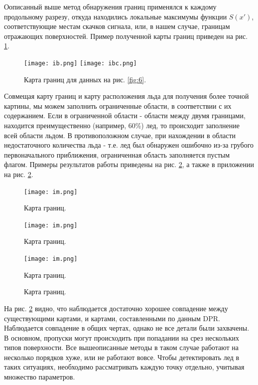Оописанный выше метод обнаружения границ применялся к каждому продольному разрезу, откуда находились локальные
максимумы функции $S(x')$, соответствующие местам скачков сигнала, или, в нашем случае, границам отражающих
поверхностей. Пример полученной карты границ приведен на рис. \ref{fig:10}.

\begin{figure}[h!]
  \centering
  \texttt{[image: ib.png]}
  \texttt{[image: ibc.png]}
  \caption{Карта границ для данных на рис. \ref{fig:6}.}
  \label{fig:10}
\end{figure}

Совмещая карту границ и карту расположения льда для получения более точной картины, мы можем заполнить ограниченные
области, в соответствии с их содержанием. Если в ограниченной области - области между двумя границами, находится
преимущественно (например, 60\%) лед, то происходит заполнение всей
области льдом. В противоположном случае, при нахождении в области недостаточного количества льда - т.е. лед был
обнаружен ошибочно из-за грубого первоначального приближения, ограниченная область заполняется пустым флагом.
Примеры результатов работы приведены на рис. \ref{fig:11}, а также в приложении на рис. \ref{fig:11}.

\begin{figure}[h!]
  \centering
  \begin{minipage}{0.32\linewidth}
    \texttt{[image: im.png]}
    \caption*{Карта границ.}
  \end{minipage}
  \begin{minipage}{0.32\linewidth}
    \texttt{[image: im.png]}
    \caption*{Карта границ.}
  \end{minipage}
  \begin{minipage}{0.32\linewidth}
    \texttt{[image: im.png]}
    \caption*{Карта границ.}
  \end{minipage}
  \caption{Карта границ.}
  \label{fig:11}
\end{figure}

На рис. \ref{fig:11} видно, что наблюдается достаточно хорошее совпадение между существующими картами, и картами, составленными
по данным DPR. Наблюдается совпадение в общих чертах, однако не все детали были захвачены. В основном, пропуски могут происходить при
попадании на срез нескольких типов поверхности. Все вышеописанные методы в таком случае работают на несколько порядков
хуже, или не работают вовсе. Чтобы детектировать лед в таких ситуациях, необходимо рассматривать каждую точку отдельно,
учитывая множество параметров.

